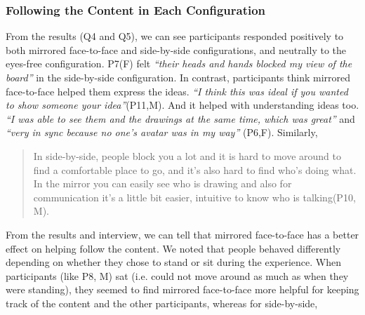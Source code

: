 \documentclass[chi_draft]{sigchi}
\begin{document}
\subsubsection{Following the Content in Each Configuration}
From the results (Q4 and Q5), we can see participants responded positively to both mirrored face-to-face and side-by-side configurations, and neutrally to the eyes-free configuration.
P7(F) felt \textit{``their heads and hands blocked my view of the board''} in the side-by-side configuration. In contrast, participants think mirrored face-to-face helped them express the ideas. \textit{``I think this was ideal if you wanted to show someone your idea''}(P11,M). And it helped with understanding ideas too. \textit{``I was able to see them and the drawings at the same time, which was great''} and \textit{``very in sync because no one's avatar was in my way''} (P6,F). Similarly, 
\begin{quote}
    In side-by-side, people block you a lot and it is hard to move around to find a comfortable place to go, and it's also hard to find who's doing what. In the mirror you can easily see who is drawing and also for communication it's a little bit easier, intuitive to know who is talking(P10, M).
\end{quote}
From the results and interview, we can tell that mirrored face-to-face has a better effect on helping follow the content. We noted that people behaved differently depending on whether they chose to stand or sit during the experience. When participants (like  P8, M) sat (i.e. could not move around as much as when they were standing), they seemed to find mirrored face-to-face more helpful for keeping track of the content and the other participants, whereas for side-by-side, 

\end{document}
